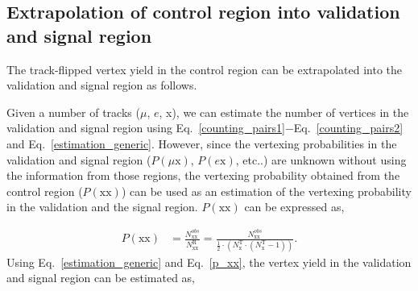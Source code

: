 \subsection{Extrapolation of control region into validation and signal region}

The track-flipped vertex yield in the control region can be extrapolated into the validation and signal region as follows.

Given a number of tracks ($\mu$, $e$, x), we can estimate the number of vertices in the validation and signal region using Eq.~\ref{counting_pairs1}$-$Eq.~\ref{counting_pairs2} and Eq.~\ref{estimation_generic}. However, since the vertexing probabilities in the validation and signal region ($P(\mu \mathrm{x})$, $P(e\mathrm{x})$, etc..) are unknown without using the information from those regions, the vertexing probability obtained from the control region ($P(\mathrm{xx})$) can be used as an estimation of the vertexing probability in the validation and the signal region. $P(\mathrm{xx})$ can be expressed as,

\begin{align}
\label{p_xx}
P(\mathrm{xx}) &= \frac{N_{\mathrm{xx}}^{obs}}{N^{\mathrm{R}}_{\mathrm{xx}}} = \frac{N_{\mathrm{xx}}^{obs}}{{\frac{1}{2} \cdot (N^{\mathrm{T}}_{\mathrm{x}}\cdot(N^{\mathrm{T}}_{\mathrm{x}}-1))}}.
\end{align}
%
Using Eq.~\ref{estimation_generic} and Eq.~\ref{p_xx}, the vertex yield in the validation and signal region can be estimated as,

